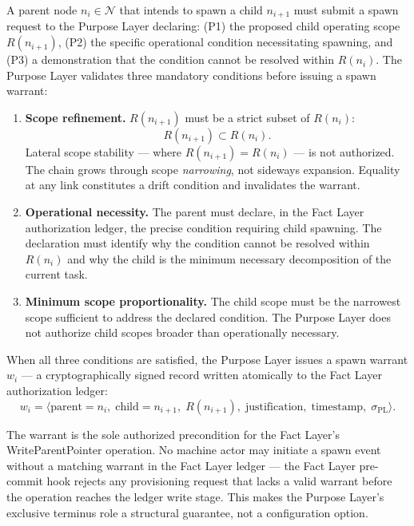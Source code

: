 \begin{dfn}\label{dfn:purpose-authorization}
A parent node $n_i \in \mathcal{N}$ that intends to spawn a child $n_{i+1}$ must submit a spawn request to the Purpose Layer declaring: (P1) the proposed child operating scope $R(n_{i+1})$, (P2) the specific operational condition necessitating spawning, and (P3) a demonstration that the condition cannot be resolved within $R(n_i)$. The Purpose Layer validates three mandatory conditions before issuing a spawn warrant:

\begin{enumerate}
    \item[(P1)] \textbf{Scope refinement.} $R(n_{i+1})$ must be a strict subset of $R(n_i)$:
    \begin{equation}
    R(n_{i+1}) \subset R(n_i).
    \label{eq:scope-refinement}
    \end{equation}
    Lateral scope stability --- where $R(n_{i+1}) = R(n_i)$ --- is not authorized. The chain grows through scope \emph{narrowing}, not sideways expansion. Equality at any link constitutes a drift condition and invalidates the warrant.

    \item[(P2)] \textbf{Operational necessity.} The parent must declare, in the Fact Layer authorization ledger, the precise condition requiring child spawning. The declaration must identify why the condition cannot be resolved within $R(n_i)$ and why the child is the minimum necessary decomposition of the current task.

    \item[(P3)] \textbf{Minimum scope proportionality.} The child scope must be the narrowest scope sufficient to address the declared condition. The Purpose Layer does not authorize child scopes broader than operationally necessary.
\end{enumerate}
\end{dfn}

When all three conditions are satisfied, the Purpose Layer issues a spawn warrant $w_i$ --- a cryptographically signed record written atomically to the Fact Layer authorization ledger:
\begin{equation}
w_i = \bigl\langle
\text{parent}=n_i,\;
\text{child}=n_{i+1},\;
R(n_{i+1}),\;
\text{justification},\;
\text{timestamp},\;
\sigma_{\text{PL}}
\bigr\rangle .
\label{eq:spawn-warrant}
\end{equation}

The warrant is the sole authorized precondition for the Fact Layer's WriteParentPointer operation. No machine actor may initiate a spawn event without a matching warrant in the Fact Layer ledger --- the Fact Layer pre-commit hook rejects any provisioning request that lacks a valid warrant before the operation reaches the ledger write stage. This makes the Purpose Layer's exclusive terminus role a structural guarantee, not a configuration option.

